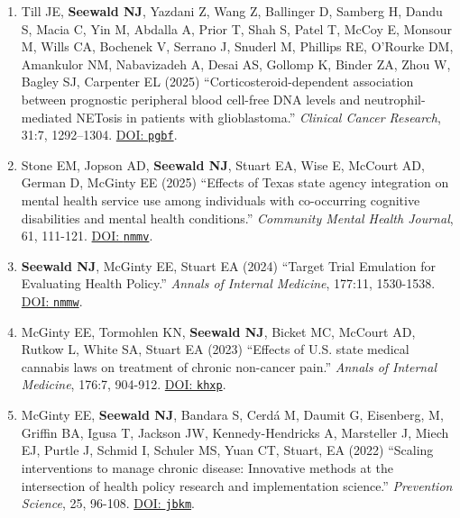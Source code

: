 \documentclass[letterpaper,11pt]{article} %
\begin{document}
	\begin{enumerate}
    
        \item Till JE, \textbf{Seewald NJ}, Yazdani Z, Wang Z, Ballinger D, Samberg H, Dandu S, Macia C, Yin M, Abdalla A, Prior T, Shah S, Patel T, McCoy E, Monsour M, Wills CA, Bochenek V, Serrano J, Snuderl M, Phillips RE, O'Rourke DM, Amankulor NM, Nabavizadeh A, Desai AS, Gollomp K, Binder ZA, Zhou W, Bagley SJ, Carpenter EL (2025) ``Corticosteroid-dependent association between prognostic peripheral blood cell-free DNA levels and neutrophil-mediated NETosis in patients with glioblastoma.'' \textit{Clinical Cancer Research}, 31:7, 1292–1304. \href{https://doi.org/pgbf}{DOI: \texttt{pgbf}}.

        \item Stone EM, Jopson AD, \textbf{Seewald NJ}, Stuart EA, Wise E, McCourt AD, German D, McGinty EE (2025) ``Effects of Texas state agency integration on mental health service use among individuals with co-occurring cognitive disabilities and mental health conditions.'' \textit{Community Mental Health Journal}, 61, 111-121. \href{https://doi.org/nmmv}{DOI: \texttt{nmmv}}.
        
		\item \textbf{Seewald NJ}, McGinty EE, Stuart EA (2024) ``Target Trial Emulation for Evaluating Health Policy.'' \textit{Annals of Internal Medicine}, 177:11, 1530-1538. \href{https://doi.org/nmmw}{DOI: \texttt{nmmw}}.
		
		
		\item McGinty EE, Tormohlen KN, \textbf{Seewald NJ}, Bicket MC, McCourt AD, Rutkow L, White SA, Stuart EA (2023) ``Effects of U.S. state medical cannabis laws on treatment of chronic non-cancer pain.'' \textit{Annals of Internal Medicine}, 176:7, 904-912. \href{https://doi.org/khxp}{DOI: \texttt{khxp}}.
		
		\item McGinty EE, \textbf{Seewald NJ}, Bandara S, Cerd\'{a} M, Daumit G, Eisenberg, M, Griffin BA, Igusa T, Jackson JW, Kennedy-Hendricks A, Marsteller J, Miech EJ, Purtle J, Schmid I, Schuler MS, Yuan CT, Stuart, EA (2022) ``Scaling interventions to manage chronic disease: Innovative methods at the intersection of health policy research and implementation science.'' \textit{Prevention Science}, 25, 96-108. \href{https://doi.org/jbkm}{DOI: \texttt{jbkm}}.
		

\end{enumerate}
\end{document}
